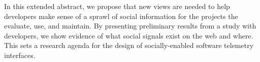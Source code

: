In this extended abstract, we propose that new views are needed to help developers make sense of a sprawl of social information for the projects the evaluate, use, and maintain.
By presenting preliminary results from a study with developers, we show evidence of what social signals exist on the web and where.
This sets a research agenda for the design of socially-enabled software telemetry interfaces.
